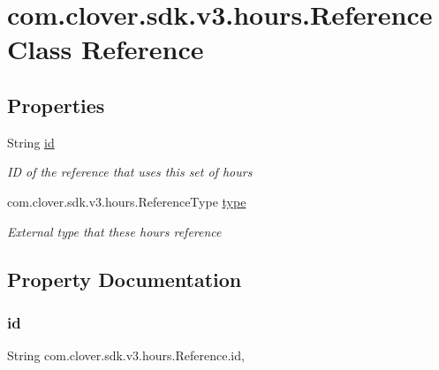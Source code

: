 \hypertarget{classcom_1_1clover_1_1sdk_1_1v3_1_1hours_1_1_reference}{}\section{com.\+clover.\+sdk.\+v3.\+hours.\+Reference Class Reference}
\label{classcom_1_1clover_1_1sdk_1_1v3_1_1hours_1_1_reference}
\subsection*{Properties}
\begin{DoxyCompactItemize}
\item 
String \hyperlink{classcom_1_1clover_1_1sdk_1_1v3_1_1hours_1_1_reference_a90adac087d76238ec6608fa6a8c41135}{id}
\begin{DoxyCompactList}\small\item\em ID of the reference that uses this set of hours \end{DoxyCompactList}\item 
com.\+clover.\+sdk.\+v3.\+hours.\+Reference\+Type \hyperlink{classcom_1_1clover_1_1sdk_1_1v3_1_1hours_1_1_reference_ad2681c4206e183b6b2415b93ca2278d7}{type}
\begin{DoxyCompactList}\small\item\em External type that these hours reference \end{DoxyCompactList}\end{DoxyCompactItemize}


\subsection{Property Documentation}
\mbox{\label{classcom_1_1clover_1_1sdk_1_1v3_1_1hours_1_1_reference_a90adac087d76238ec6608fa6a8c41135}} 
\subsubsection{\texorpdfstring{id}{id}}
{\footnotesize\ttfamily String com.\+clover.\+sdk.\+v3.\+hours.\+Reference.\+id\hspace{0.3cm}{\ttfamily [get]}, {\ttfamily [set]}}



